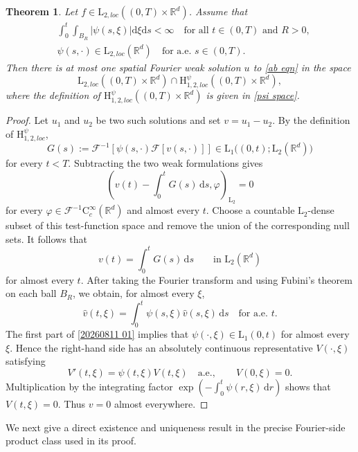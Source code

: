 \documentclass[11pt,reqno]{amsart}
\newtheorem{thm}{Theorem}[section]
\theoremstyle{definition}
\theoremstyle{remark}
\newcommand\bR{\mathbb{R}}
\newcommand\cF{\mathcal{F}}
\numberwithin{equation}{section}
\begin{document}
\begin{thm}
										\label{uniqueness theorem}
Let $f \in \mathrm{L}_{2,loc}\left( (0,T) \times \bR^d \right)$. 
Assume that 
\begin{equation}
										\label{20260811 01}
\begin{aligned}
&\int_0^t \int_{B_R} |\psi(s,\xi)|\mathrm{d}\xi \mathrm{d}s < \infty
\quad \text{for all } t \in (0,T) \text{ and } R > 0,\\
&\psi(s,\cdot)\in \mathrm{L}_{2,loc}(\bR^d)
\quad \text{for a.e. }s\in(0,T).
\end{aligned}
\end{equation}
Then there is at most one spatial Fourier weak solution $u$ to \eqref{ab eqn} in the space
$$
 \mathrm{L}_{2,loc}\left( (0,T) \times \bR^d \right) \cap \mathrm{H}_{1,2,loc}^{\psi}\left( (0,T) \times \bR^d\right),
$$
where the definition of $\mathrm{H}_{1,2,loc}^{\psi}\left( (0,T) \times \bR^d\right)$ is given in \eqref{psi space}.
\end{thm}
\begin{proof}
Let $u_1$ and $u_2$ be two such solutions and set $v=u_1-u_2$.
By the definition of $\mathrm{H}_{1,2,loc}^{\psi}$,
\[
G(s):=\cF^{-1}\!\left[\psi(s,\cdot)\cF[v(s,\cdot)]\right]
\in \mathrm{L}_1\big((0,t);\mathrm{L}_2(\bR^d)\big)
\]
for every $t<T$.  Subtracting the two weak formulations gives
\[
\left(v(t)-\int_0^tG(s)\,\mathrm{d}s,\varphi\right)_{\mathrm L_2}=0
\]
for every $\varphi\in\cF^{-1}\mathrm C_c^\infty(\bR^d)$ and almost every
$t$.  Choose a countable $\mathrm L_2$-dense subset of this test-function
space and remove the union of the corresponding null sets.  It follows that
\[
v(t)=\int_0^tG(s)\,\mathrm{d}s\qquad\text{in }\mathrm L_2(\bR^d)
\]
for almost every $t$.  After taking the Fourier transform and using Fubini's
theorem on each ball $B_R$, we obtain, for almost every $\xi$,
\[
\widehat v(t,\xi)=\int_0^t\psi(s,\xi)\widehat v(s,\xi)\,\mathrm{d}s
\quad\text{for a.e. }t.
\]
The first part of \eqref{20260811 01} implies that
$\psi(\cdot,\xi)\in\mathrm L_1(0,t)$ for almost every $\xi$.  Hence the
right-hand side has an absolutely continuous representative $V(\cdot,\xi)$
satisfying
\[
V'(t,\xi)=\psi(t,\xi)V(t,\xi)\quad\text{a.e.},
\qquad V(0,\xi)=0.
\]
Multiplication by the integrating factor
$\exp(-\int_0^t\psi(r,\xi)\,\mathrm{d}r)$ shows that $V(t,\xi)=0$.
Thus $v=0$ almost everywhere.
\end{proof}



We next give a direct existence and uniqueness result in the precise
Fourier-side product class used in its proof.
\end{document}
